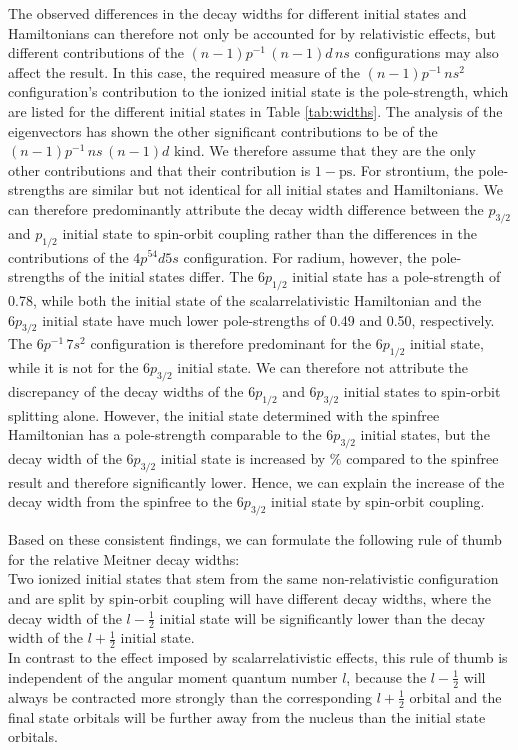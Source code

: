 \documentclass[aps,amssymb,preprint,a4paper]{revtex4}
\begin{document}
The observed differences in the decay widths for different initial states and
Hamiltonians can therefore not only be accounted for by relativistic
effects, but different contributions of the $(n-1)p^{-1} \,(n-1)d \, ns$
configurations may also affect the result.
In this case, the required measure of the $(n-1)p^{-1} \, ns^2$ configuration's
contribution to the ionized initial state is the pole-strength,
which are listed for the different initial states in Table \ref{tab:widths}.
The analysis of the eigenvectors has shown the other significant contributions
to be of the $(n-1)p^{-1} \,ns \, (n-1)d$ kind. We therefore assume that
they are the only other contributions and that their contribution is $1-\text{ps}$.
For strontium, the pole-strengths are similar but not identical for all initial
states and Hamiltonians. 
We can therefore predominantly attribute the decay width difference between the
$p_{3/2}$ and $p_{1/2}$ initial state to spin-orbit coupling rather than the
differences in the contributions of the $4p^54d5s$ configuration.
For radium, however, the pole-strengths of the initial states differ.
The $6p_{1/2}$ initial state has a pole-strength of 0.78, while both the
initial state of the scalarrelativistic Hamiltonian and the $6p_{3/2}$ initial
state have much lower pole-strengths of 0.49 and 0.50, respectively.
The $6p^{-1} \,7s^2$ configuration is therefore predominant for the $6p_{1/2}$
initial state, while it is not for the $6p_{3/2}$ initial state.
We can therefore not attribute the discrepancy of the decay widths of the
$6p_{1/2}$ and $6p_{3/2}$ initial states to spin-orbit splitting alone.
However, the initial state determined with the spinfree
Hamiltonian has a pole-strength comparable to the $6p_{3/2}$ initial states,
but the decay width of the $6p_{3/2}$ initial state is increased by \unit[236]{\%}
compared to the spinfree result and therefore
significantly lower.
Hence, we can explain the increase of the decay width from the spinfree to the
$6p_{3/2}$ initial state by spin-orbit coupling.

Based on these consistent findings, we can formulate the following rule of thumb for
the relative Meitner decay widths:\\
Two ionized initial states that stem from the same non-relativistic configuration and
are split by spin-orbit coupling will have different decay widths, where the decay width
of the $l-\frac12$ initial state will be significantly lower than the decay width of
the $l + \frac12$ initial state.\\
In contrast to the effect imposed by scalarrelativistic effects, this rule
of thumb is independent of the angular moment quantum number $l$, because the
$l-\frac12$ will always be contracted more strongly than the corresponding
$l+\frac12$ orbital and the final state orbitals will be further away from
the nucleus than the initial state orbitals.
\end{document}
